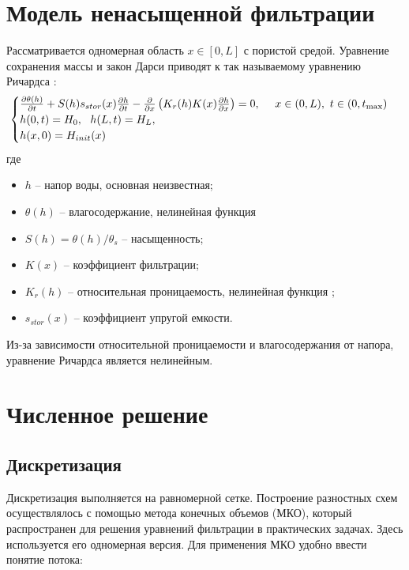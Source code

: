 \documentclass[a4paper,12pt]{article}
\begin{document}
\section{Модель ненасыщенной фильтрации}
Рассматривается одномерная область $x\in[0,L]$ с пористой средой. Уравнение сохранения массы и закон Дарси приводят к так называемому уравнению Ричардса \cite{BearCheng}:
\begin{equation}\label{eq:ivp_richards_1d}
	\begin{cases}
		\textcolor{black}
		{
			\frac{\partial \theta(h)}{\partial t} + S(h)
		}
		s_{stor}(x)\frac{\partial h}{\partial t} - \frac{\partial}{\partial x}\left(
		\textcolor{black}{K_r(h)}
		K(x)\frac{\partial h}{\partial x}\right) = 0, ~~~~ x \in (0,L), ~ t\in(0, t_{\max})\\
		h(0,t) = H_0,~~h(L,t) = H_L,\\
		h(x,0) = H_{init}(x)
	\end{cases}
\end{equation}
где
\begin{itemize}
	\item $h$ -- напор воды, основная неизвестная;
	\item $\theta(h)$ -- влагосодержание, нелинейная функция \cite{Mualem}
	\item $S(h) = \theta(h)/\theta_s$ -- насыщенность;
	\item $K(x)$ -- коэффициент фильтрации;
	\item $K_r(h)$ -- относительная проницаемость, нелинейная функция \cite{VG};
	\item $s_{stor}(x)$ -- коэффициент упругой емкости.
\end{itemize}

Из-за зависимости относительной проницаемости и влагосодержания от напора, уравнение Ричардса является нелинейным. 

\section{Численное решение}
\subsection{Дискретизация}

Дискретизация выполняется на равномерной сетке. Построение разностных схем осуществлялось с помощью метода конечных объемов (МКО), который распространен для решения уравнений фильтрации в практических задачах. Здесь используется его одномерная версия. Для применения МКО удобно ввести понятие потока:
\end{document}
